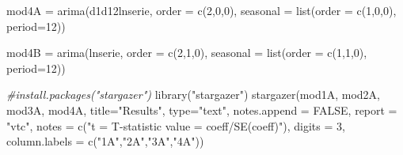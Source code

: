 \documentclass[
]{article}
\newenvironment{Shaded}{\begin{snugshade}}{\end{snugshade}}
\newcommand{\AttributeTok}[1]{\textcolor[rgb]{0.77,0.63,0.00}{#1}}
\newcommand{\CommentTok}[1]{\textcolor[rgb]{0.56,0.35,0.01}{\textit{#1}}}
\newcommand{\ConstantTok}[1]{\textcolor[rgb]{0.00,0.00,0.00}{#1}}
\newcommand{\DecValTok}[1]{\textcolor[rgb]{0.00,0.00,0.81}{#1}}
\newcommand{\FunctionTok}[1]{\textcolor[rgb]{0.00,0.00,0.00}{#1}}
\newcommand{\NormalTok}[1]{#1}
\newcommand{\OtherTok}[1]{\textcolor[rgb]{0.56,0.35,0.01}{#1}}
\newcommand{\StringTok}[1]{\textcolor[rgb]{0.31,0.60,0.02}{#1}}
\begin{document}
\begin{Shaded}
\begin{Highlighting}[]
\NormalTok{mod4A }\OtherTok{=} \FunctionTok{arima}\NormalTok{(d1d12lnserie, }\AttributeTok{order =} \FunctionTok{c}\NormalTok{(}\DecValTok{2}\NormalTok{,}\DecValTok{0}\NormalTok{,}\DecValTok{0}\NormalTok{), }\AttributeTok{seasonal =} \FunctionTok{list}\NormalTok{(}\AttributeTok{order =} \FunctionTok{c}\NormalTok{(}\DecValTok{1}\NormalTok{,}\DecValTok{0}\NormalTok{,}\DecValTok{0}\NormalTok{), }\AttributeTok{period=}\DecValTok{12}\NormalTok{))}
\end{Highlighting}
\end{Shaded}

\begin{Shaded}
\begin{Highlighting}[]
\NormalTok{mod4B }\OtherTok{=} \FunctionTok{arima}\NormalTok{(lnserie, }\AttributeTok{order =} \FunctionTok{c}\NormalTok{(}\DecValTok{2}\NormalTok{,}\DecValTok{1}\NormalTok{,}\DecValTok{0}\NormalTok{), }\AttributeTok{seasonal =} \FunctionTok{list}\NormalTok{(}\AttributeTok{order =} \FunctionTok{c}\NormalTok{(}\DecValTok{1}\NormalTok{,}\DecValTok{1}\NormalTok{,}\DecValTok{0}\NormalTok{), }\AttributeTok{period=}\DecValTok{12}\NormalTok{))}
\end{Highlighting}
\end{Shaded}

\begin{Shaded}
\begin{Highlighting}[]
\CommentTok{\#install.packages("stargazer")}
\FunctionTok{library}\NormalTok{(}\StringTok{"stargazer"}\NormalTok{)}
\FunctionTok{stargazer}\NormalTok{(mod1A, mod2A, mod3A, mod4A, }\AttributeTok{title=}\StringTok{"Results"}\NormalTok{, }\AttributeTok{type=}\StringTok{"text"}\NormalTok{, }\AttributeTok{notes.append =} \ConstantTok{FALSE}\NormalTok{, }\AttributeTok{report =} \StringTok{"vtc"}\NormalTok{,}
\AttributeTok{notes =} \FunctionTok{c}\NormalTok{(}\StringTok{"t = T{-}statistic value = coeff/SE(coeff)"}\NormalTok{), }\AttributeTok{digits =} \DecValTok{3}\NormalTok{,  }\AttributeTok{column.labels =} \FunctionTok{c}\NormalTok{(}\StringTok{"1A"}\NormalTok{,}\StringTok{"2A"}\NormalTok{,}\StringTok{"3A"}\NormalTok{,}\StringTok{"4A"}\NormalTok{))}
\end{Highlighting}
\end{Shaded}
\end{document}
